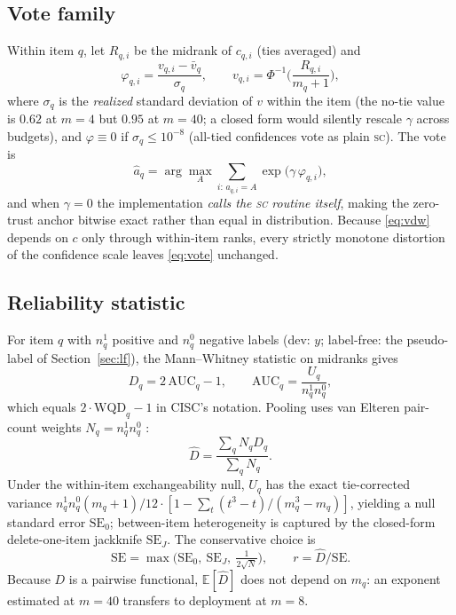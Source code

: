\documentclass[twoside,11pt]{article}
\newcommand{\Dhat}{\widehat{D}}
\newcommand{\SC}{\textsc{sc}}
\begin{document}
\subsection{Vote family}
Within item $q$, let $R_{q,i}$ be the midrank of $c_{q,i}$ (ties averaged) and
\begin{equation}\label{eq:vdw}
\varphi_{q,i}=\frac{v_{q,i}-\bar v_q}{\sigma_q},\qquad v_{q,i}=\Phi^{-1}\!\Big(\frac{R_{q,i}}{m_q+1}\Big),
\end{equation}
where $\sigma_q$ is the \emph{realized} standard deviation of $v$ within the item (the no-tie value is $0.62$ at $m{=}4$ but $0.95$ at $m{=}40$; a closed form would silently rescale $\gamma$ across budgets), and $\varphi\equiv 0$ if $\sigma_q\le 10^{-8}$ (all-tied confidences vote as plain \SC). The vote is
\begin{equation}\label{eq:vote}
\hat a_q=\arg\max_A \sum_{i:\,a_{q,i}=A}\exp\big(\gamma\,\varphi_{q,i}\big),
\end{equation}
and when $\gamma=0$ the implementation \emph{calls the \SC{} routine itself}, making the zero-trust anchor bitwise exact rather than equal in distribution. Because \eqref{eq:vdw} depends on $c$ only through within-item ranks, every strictly monotone distortion of the confidence scale leaves \eqref{eq:vote} unchanged.

\subsection{Reliability statistic}
For item $q$ with $n^1_q$ positive and $n^0_q$ negative labels (dev: $y$; label-free: the pseudo-label of Section~\ref{sec:lf}), the Mann--Whitney statistic on midranks gives
\begin{equation}
D_q = 2\,\mathrm{AUC}_q-1,\qquad \mathrm{AUC}_q=\frac{U_q}{n^1_q n^0_q},
\end{equation}
which equals $2\cdot\mathrm{WQD}_q-1$ in CISC's notation. Pooling uses van Elteren pair-count weights $N_q=n^1_q n^0_q$ \citep{vanelteren1960}:
\begin{equation}\label{eq:pooled}
\Dhat=\frac{\sum_q N_q D_q}{\sum_q N_q}.
\end{equation}
Under the within-item exchangeability null, $U_q$ has the exact tie-corrected variance $n^1_qn^0_q(m_q{+}1)/12\cdot[1-\sum_t(t^3-t)/(m_q^3-m_q)]$, yielding a null standard error $\mathrm{SE}_0$; between-item heterogeneity is captured by the closed-form delete-one-item jackknife $\mathrm{SE}_J$. The conservative choice is
\begin{equation}
\mathrm{SE}=\max\big(\mathrm{SE}_0,\ \mathrm{SE}_J,\ \tfrac{1}{2\sqrt{N}}\big),\qquad r=\Dhat/\mathrm{SE}.
\end{equation}
Because $D$ is a pairwise functional, $\mathbb{E}[\Dhat]$ does not depend on $m_q$: an exponent estimated at $m{=}40$ transfers to deployment at $m{=}8$.
\end{document}
